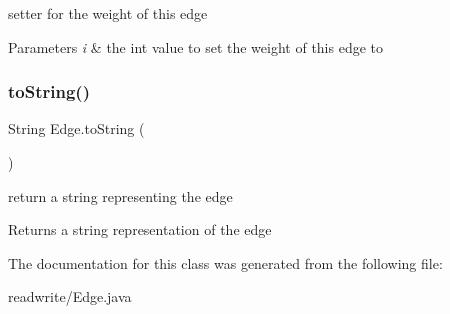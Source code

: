 setter for the weight of this edge 


\begin{DoxyParams}{Parameters}
{\em i} & the int value to set the weight of this edge to \\
\hline
\end{DoxyParams}
\mbox{\label{class_edge_aff5a34ad7c7b523fb46af257e6a16a4b}} 
\subsubsection{\texorpdfstring{to\+String()}{toString()}}
{\footnotesize\ttfamily String Edge.\+to\+String (\begin{DoxyParamCaption}{ }\end{DoxyParamCaption})}



return a string representing the edge 

\begin{DoxyReturn}{Returns}
a string representation of the edge 
\end{DoxyReturn}


The documentation for this class was generated from the following file\+:\begin{DoxyCompactItemize}
\item 
readwrite/Edge.\+java\end{DoxyCompactItemize}
